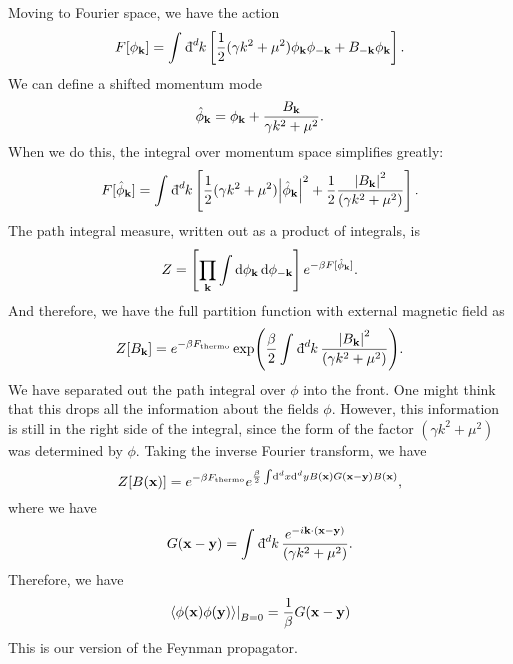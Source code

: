 Moving to Fourier space, we have the action
\begin{equation}
  F[\phi_{\vb{k}}] = \int_{}^{} \bdd[d]{k} \left[ \frac{1}{2} (\gamma k^2 + \mu^2) \phi_{\vb{k}} \phi_{-\vb{k}} + B_{-\vb{k}} \phi_{\vb{k}} \right].
\end{equation}
We can define a shifted momentum mode
\begin{equation}
  \hat \phi_{\vb{k}} = \phi_{\vb{k}} + \frac{B_{\vb{k}}}{\gamma k^2 + \mu^2}.
\end{equation}
When we do this, the integral over momentum space simplifies greatly:
\begin{equation}
  F[\hat \phi_{\vb{k}}] = \int_{}^{} \bdd[d]{k} \left[ \frac{1}{2} (\gamma k^2 + \mu^2) \abs{\hat \phi_{\vb{k}}}^2 + \frac{1}{2} \frac{\abs{B_{\vb{k}}}^2}{(\gamma k^2 + \mu^2)} \right].
\end{equation}
The path integral measure, written out as a product of integrals, is
\begin{equation}
  Z = \left[\prod_{\vb{k}} \int \dd{\phi_{\vb{k}}} \dd{\phi_{-\vb{k}}}\right] e^{-\beta F[\hat \phi_{\vb{k}}]}.
\end{equation}
And therefore, we have the full partition function with external magnetic field as
\begin{equation}
  Z[B_{\vb{k}}] = e^{-\beta F_{\text{thermo}}} \exp(\frac{\beta}{2} \int_{}^{} \bdd[d]{k} \frac{\abs{B_{\vb{k}}}^2}{(\gamma k^2 + \mu^2)}).
\end{equation}
We have separated out the path integral over $\phi$ into the front.
One might think that this drops all the information about the fields $\phi$. However, this information is still in the right side of the integral, since the form of the factor $(\gamma k^2 + \mu^2)$ was determined by $\phi$.
Taking the inverse Fourier transform, we have
\begin{equation}
  Z[B(\vb{x})] = e^{-\beta F_{\text{thermo}}} e^{\frac{\beta}{2} \int \dd[d]{x} \dd[d]{y} B(\vb{x}) G(\vb{x} - \vb{y}) B(\vb{x})},
\end{equation}
where we have
\begin{equation}
  G(\vb{x} - \vb{y}) = \int_{}^{} \bdd[d]{k} \frac{e^{-i \vb{k} \cdot (\vb{x} - \vb{y})}}{(\gamma k^2 + \mu^2)}.
\end{equation}
Therefore, we have
\begin{equation}
  \left.\langle \phi(\vb{x}) \phi(\vb{y}) \rangle \right\rvert_{B = 0} = \frac{1}{\beta} G(\vb{x} - \vb{y})
\end{equation}
This is our version of the Feynman propagator.
